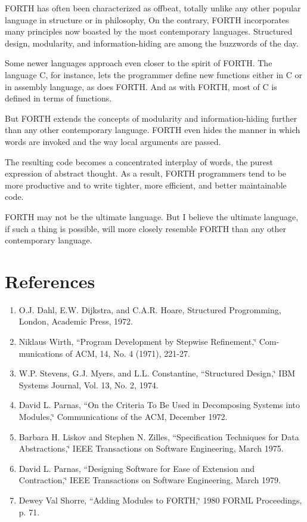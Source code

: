 FORTH has often been characterized as offbeat, totally unlike any
other popular language in structure or in philosophy, On the contrary,
FORTH incorporates many principles now boasted by the most contemporary
languages. Structured design, modularity, and information-hiding are
among the buzzwords of the day.

Some newer languages approach even closer to the spirit of FORTH.
The language C, for instance, lets the programmer define new functions
either in C or in assembly language, as does FORTH. And as with FORTH,
most of C is defined in terms of functions.

But FORTH extends the concepts of modularity and information-hiding
further than any other contemporary language. FORTH even hides the
manner in which words are invoked and the way local arguments are
passed.

The resulting code becomes a concentrated interplay of words, the
purest expression of abstract thought. As a result, FORTH programmers
tend to be more productive and to write tighter, more efficient, and
better maintainable code.

FORTH may not be the ultimate language. But I believe the ultimate
language, if such a thing is possible, will more closely resemble
FORTH than any other contemporary language.


\section{References}

\begin{enumerate}
\item O.J. Dahl, E.W. Dijkstra, and C.A.R. Hoare, Structured Progromming,
London, Academic Press, 1972.
\item Niklaus Wirth, {}``Program Development by Stepwise Refinement,\char`\"{}
Com- munications of ACM, 14, No. 4 (1971), 221-27.
\item W.P. Stevens, G.J. Myers, and L.L. Constantine, {}``Structured Design,\char`\"{}
IBM Systems Journal, Vol. 13, No. 2, 1974.
\item David L. Parnas, {}``On the Criteria To Be Used in Decomposing Systems
into Modules,\char`\"{} Communications of the ACM, December 1972.
\item Barbara H. Liskov and Stephen N. Zilles, {}``Specification Techniques
for Data Abstractions,\char`\"{} IEEE Transactions on Software Engineering,
March 1975.
\item David L. Parnas, {}``Designing Software for Ease of Extension and
Contraction,\char`\"{} IEEE Transactions on Software Engineering,
March 1979.
\item Dewey Val Shorre, {}``Adding Modules to FORTH,\char`\"{} 1980 FORML
Proceedings, p. 71.
\end{enumerate}
